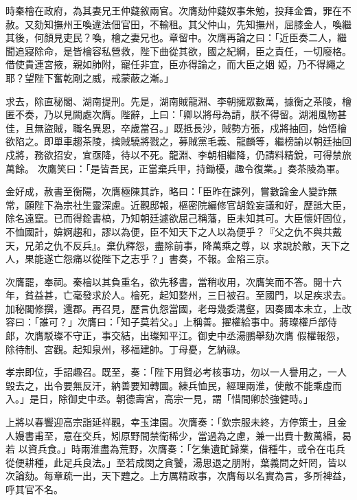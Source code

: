 \begin{pinyinscope}
 時秦檜在政府，為其妻兄王仲薿敘兩官。次膺劾仲薿奴事朱勉，投拜金酋，罪在不赦。又劾知撫州王喚違法佃官田，不輸租。其父仲山，先知撫州，屈膝金人，喚繼其後，何顏見吏民？喚，檜之妻兄也。章留中。次膺再論之曰：「近臣奏二人，繼聞追寢除命，是皆檜容私營救，陛下曲從其欲，國之紀綱，臣之責任，一切廢格。借使貴連宮掖，親如肺附，寵任非宜，臣亦得論之，而大臣之姻
 婭，乃不得繩之耶？望陛下奮乾剛之威，戒蒙蔽之漸。」



 求去，除直秘閣、湖南提刑。先是，湖南賊龍淵、李朝擁眾數萬，據衡之茶陵，檜匿不奏，乃以見闕處次膺。陛辭，上曰：「卿以將母為請，朕不得留。湖湘風物甚佳，且無盜賊，職名異恩，卒歲當召。」既抵長沙，賊勢方張，戍將抽回，始悟檜欲陷之。即單車趨茶陵，擒賊驍將戮之，募賊黨毛義、龍麟等，繼榜諭以朝廷抽回戍將，務欲招安，宜亟降，待以不死。龍淵、李朝相繼降，仍請料精銳，可得禁旅萬餘。
 次鷹笑曰：「是皆吾民，正當棄兵甲，持鋤櫌，趣令復業。」奏茶陵為軍。



 金好成，赦書至衡陽，次膺極陳其詐，略曰：「臣昨在諫列，嘗數論金人變詐無常，願陛下為宗社生靈深慮。近觀邸報，樞密院編修官胡銓妄議和好，歷詆大臣，除名遠竄。已而得銓書槁，乃知朝廷遽欲屈己稱藩，臣未知其可。大臣懷奸固位，不恤國計，媕婀趨和，謬以為便，臣不知天下之人以為便乎？『父之仇不與共戴天，兄弟之仇不反兵』。棄仇釋怨，盡除前事，降萬乘之尊，以
 求說於敵，天下之人，果能遂亡怨痛以從陛下之志乎？」書奏，不報。金陷三京。



 次膺罷，奉祠。秦檜以其負重名，欲先移書，當稍收用，次膺笑而不答。閱十六年，貧益甚，亡毫發求於人。檜死，起知婺州，三日被召。至國門，以足疾求去。加秘閣修撰，還郡。再召見，歷言仇怨當國，老母幾委溝壑，因奏國本未立，上改容曰：「誰可？」次膺曰：「知子莫若父。」上稱善。擢權給事中。蔣璨權戶部侍郎，次膺駁璨不守正，事交結，出璨知平江。御史中丞湯鵬舉劾次膺
 假權報怨，除待制、宮觀。起知泉州，移福建帥。丁母憂，乞納祿。



 孝宗即位，手詔趣召。既至，奏：「陛下用賢必考核事功，勿以一人譽用之，一人毀去之，出令要無反汗，納善要知轉圜。練兵恤民，經理兩淮，使敵不能乘虛而入。」是日，除御史中丞。朝德壽宮，高宗一見，謂「惜間卿於強健時。」



 上將以春饗迎高宗詣延祥觀，幸玉津園。次膺奏：「欽宗服未終，方停策士，且金人嫚書甫至，意在交兵，矧原野間禁衛稀少，當過為之慮，兼一出費十數萬緡，曷若
 以資兵食。」時兩淮盡為荒野，次膺奏：「乞集遺甿歸業，借種牛，或令在屯兵從便耕種，此足兵良法。」至若成閔之貪饕，湯思退之朋附，葉義問之奸罔，皆以次論劾。每章疏一出，天下韙之。上方厲精政事，次膺每以名實為言，多所裨益，呼其官不名。




\end{pinyinscope}
